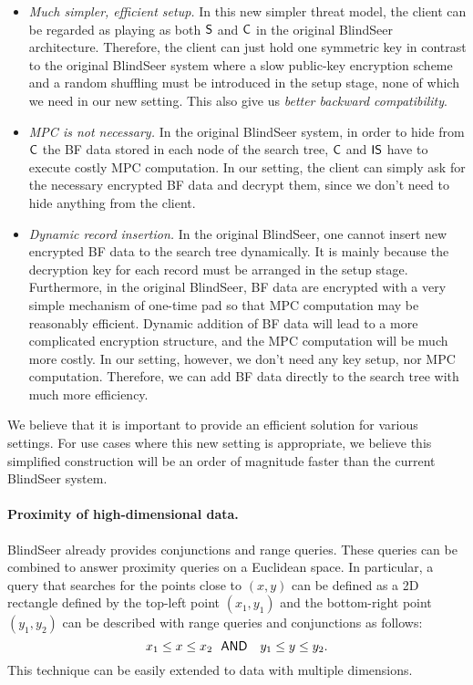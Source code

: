 \begin{itemize}\setlength\itemsep{0em}
\item {\em Much simpler, efficient setup.}
In this new simpler threat model, the client can be regarded as playing as both
$\sf S$ and $\sf C$ in the original BlindSeer architecture. Therefore, the
client can just hold one symmetric key in contrast to the original BlindSeer
system where a slow public-key encryption scheme and a random shuffling
must be introduced in the setup stage, none of which we need in our new
setting. This also give us {\em better backward compatibility}.

\item {\em MPC is not necessary.} In the original BlindSeer system, in order to
hide from $\sf C$ the BF data stored in each node of the search tree, $\sf
C$ and $\sf IS$ have to execute costly MPC computation. In our setting, the
    client can simply ask for the necessary encrypted BF data and decrypt them,
    since we don't need to hide anything from the client.  


\item {\em Dynamic record insertion.} In the original BlindSeer, one cannot
insert new encrypted BF data to the search tree dynamically.  It is mainly
because the decryption key for each record must be arranged in the setup
stage.
%
Furthermore, in the original BlindSeer, BF data are encrypted with a very
simple mechanism of one-time pad so that MPC computation may be reasonably
efficient. Dynamic addition of BF data will lead to a more complicated
encryption structure, and the MPC computation will be much more costly.
In our setting, however, we don't need any key setup, nor MPC computation.
Therefore, we can add BF data directly to the search tree with much more
efficiency.  
\end{itemize}

\noindent We believe that it is important to provide an efficient solution for various
settings. For use cases where this new setting is appropriate, we believe this simplified
construction will be an order of magnitude faster than the current BlindSeer system.

\paragraph{Proximity of high-dimensional data.}
BlindSeer already provides conjunctions and range queries.  These queries can be combined to answer proximity queries on a Euclidean space.
In particular, a query that searches for the points close to $(x, y)$ can be defined as a 2D rectangle defined by the top-left point $(x_1, y_1)$ and the
bottom-right point $(y_1, y_2)$ can be described with range queries and
conjunctions as follows: $$ x_1 \le x \le x_2 ~~{\sf AND}~~~ y_1 \le y \le y_2.
$$ This technique can be easily extended to data with multiple dimensions. 

